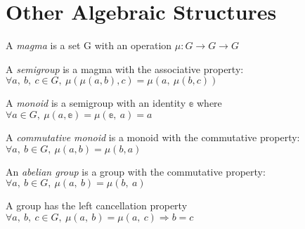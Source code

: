 \section{Other Algebraic Structures}

\begin{definition}[Magma]
    \label{definition : Magma}
    \leanok
    A \emph{magma} is a set G with an operation $\mu : G \rightarrow G \rightarrow G$
\end{definition}

\begin{definition}[Semigroup]
    \label{definition : Semigroup}
    \leanok
    A \emph{semigroup} is a magma with the associative property:
    $\forall a,~ b,~ c \in G, ~\mu(\mu(a, b), c) = \mu(a,~ \mu(b, c))$
\end{definition}

\begin{definition}[Monoid]
    \label{definition : Monoid}
    \leanok
    A \emph{monoid} is a semigroup with an identity $\mathbb{e}$ where
    $\forall a \in G, ~\mu (a, \mathbb{e}) = \mu(\mathbb{e},~ a) = a$
\end{definition}

\begin{definition}
    \label{definition : CommMonoid}
    \leanok
    A \emph{commutative monoid} is a monoid with the commutative property:
    $\forall a,~ b \in G, ~\mu(a, b) = \mu(b, a)$
\end{definition}

\begin{definition}
    \label{definition : AbelianGroup}
    \leanok
    An \emph{abelian group} is a group with the commutative property:
    $\forall a,~ b \in G, ~\mu(a,~ b) = \mu(b,~ a)$
\end{definition}

\begin{theorem}
    \label{definition : left_cancel}
    \leanok
    A group has the left cancellation property
    $\forall a,~ b,~ c \in G, ~\mu(a,~ b) = \mu(a,~ c) \Rightarrow b = c$
\end{theorem}
